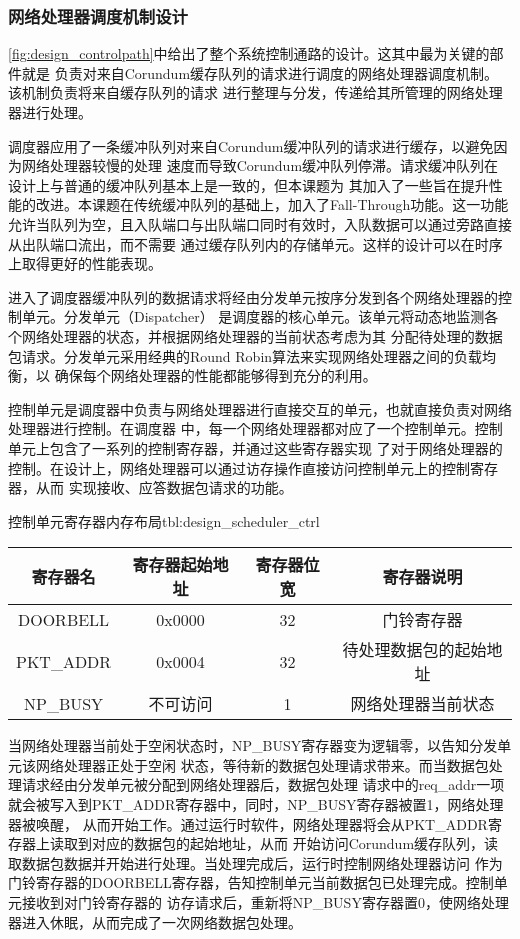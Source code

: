 \subsubsection{网络处理器调度机制设计}

\autoref{fig:design_controlpath}中给出了整个系统控制通路的设计。这其中最为关键的部件就是
负责对来自Corundum缓存队列的请求进行调度的网络处理器调度机制。该机制负责将来自缓存队列的请求
进行整理与分发，传递给其所管理的网络处理器进行处理。

调度器应用了一条缓冲队列对来自Corundum缓冲队列的请求进行缓存，以避免因为网络处理器较慢的处理
速度而导致Corundum缓冲队列停滞。请求缓冲队列在设计上与普通的缓冲队列基本上是一致的，但本课题为
其加入了一些旨在提升性能的改进。本课题在传统缓冲队列的基础上，加入了Fall-Through功能。这一功能
允许当队列为空，且入队端口与出队端口同时有效时，入队数据可以通过旁路直接从出队端口流出，而不需要
通过缓存队列内的存储单元。这样的设计可以在时序上取得更好的性能表现。

进入了调度器缓冲队列的数据请求将经由分发单元按序分发到各个网络处理器的控制单元。分发单元（Dispatcher）
是调度器的核心单元。该单元将动态地监测各个网络处理器的状态，并根据网络处理器的当前状态考虑为其
分配待处理的数据包请求。分发单元采用经典的Round Robin算法来实现网络处理器之间的负载均衡，以
确保每个网络处理器的性能都能够得到充分的利用。

控制单元是调度器中负责与网络处理器进行直接交互的单元，也就直接负责对网络处理器进行控制。在调度器
中，每一个网络处理器都对应了一个控制单元。控制单元上包含了一系列的控制寄存器，并通过这些寄存器实现
了对于网络处理器的控制。在设计上，网络处理器可以通过访存操作直接访问控制单元上的控制寄存器，从而
实现接收、应答数据包请求的功能。

\begin{generaltab}{控制单元寄存器内存布局}{tbl:design_scheduler_ctrl}
  \begin{tabular}{cccc}
    \toprule
    寄存器名 & 寄存器起始地址 & 寄存器位宽 & 寄存器说明 \\
    \midrule
    DOORBELL & 0x0000 & 32 & 门铃寄存器 \\
    PKT\_ADDR & 0x0004 & 32 & 待处理数据包的起始地址 \\
    \midrule
    NP\_BUSY & 不可访问 & 1 & 网络处理器当前状态 \\
    \bottomrule
  \end{tabular}
\end{generaltab}

当网络处理器当前处于空闲状态时，NP\_BUSY寄存器变为逻辑零，以告知分发单元该网络处理器正处于空闲
状态，等待新的数据包处理请求带来。而当数据包处理请求经由分发单元被分配到网络处理器后，数据包处理
请求中的req\_addr一项就会被写入到PKT\_ADDR寄存器中，同时，NP\_BUSY寄存器被置1，网络处理器被唤醒，
从而开始工作。通过运行时软件，网络处理器将会从PKT\_ADDR寄存器上读取到对应的数据包的起始地址，从而
开始访问Corundum缓存队列，读取数据包数据并开始进行处理。当处理完成后，运行时控制网络处理器访问
作为门铃寄存器的DOORBELL寄存器，告知控制单元当前数据包已处理完成。控制单元接收到对门铃寄存器的
访存请求后，重新将NP\_BUSY寄存器置0，使网络处理器进入休眠，从而完成了一次网络数据包处理。

